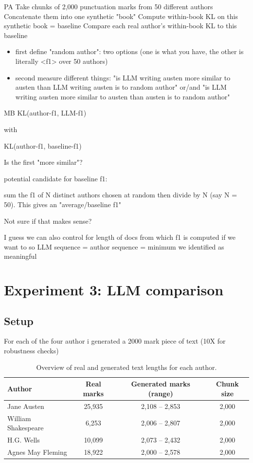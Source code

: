 \documentclass{article}
\begin{document}
PA
Take chunks of 2,000 punctuation marks from 50 different authors
Concatenate them into one synthetic "book"
Compute within-book KL on this synthetic book = baseline
Compare each real author's within-book KL to this baseline
\begin{itemize}
\item first define "random author": two options (one is what you have, the other is literally <f1> over 50 authors)
\item second measure different things: "is LLM writing austen more similar to austen than LLM writing austen is to random author" or/and "is LLM writing austen more similar to austen than austen is to random author" 
\end{itemize}


MB
KL(author-f1, LLM-f1) 

with 

KL(author-f1, baseline-f1) 

Is the first "more similar"? 

potential candidate for baseline f1: 

sum the f1 of N distinct authors chosen at random then divide by N (say N = 50). This gives an "average/baseline f1" 

Not sure if that makes sense?

I guess we can also control for length of docs from which f1 is computed if we want to so LLM sequence = author sequence = minimum we identified as meaningful

\section{Experiment 3: LLM comparison}

\subsection{Setup}

For each of the four author i generated a 2000 mark piece of text (10X for robustness checks)

\begin{table}[htbp]
\centering
\begin{tabular}{lccc}
\toprule
Author & Real marks & Generated marks (range) & Chunk size \\
\midrule
Jane Austen & 25,935 & 2,108 -- 2,853 & 2,000 \\
William Shakespeare & 6,253 & 2,006 -- 2,807 & 2,000 \\
H.G. Wells & 10,099 & 2,073 -- 2,432 & 2,000 \\
Agnes May Fleming & 18,922 & 2,000 -- 2,578 & 2,000 \\
\bottomrule
\end{tabular}
\caption{Overview of real and generated text lengths for each author.}
\label{tab:setup}
\end{table}
\end{document}
